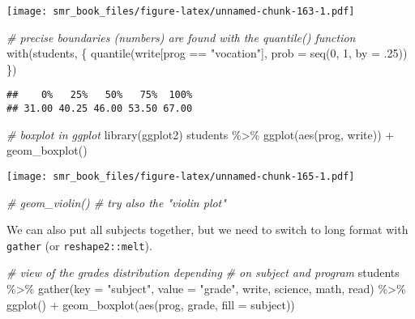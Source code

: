\documentclass[
  oneside]{book}
\newenvironment{Shaded}{\begin{snugshade}}{\end{snugshade}}
\newcommand{\AttributeTok}[1]{\textcolor[rgb]{0.77,0.63,0.00}{#1}}
\newcommand{\CommentTok}[1]{\textcolor[rgb]{0.56,0.35,0.01}{\textit{#1}}}
\newcommand{\DecValTok}[1]{\textcolor[rgb]{0.00,0.00,0.81}{#1}}
\newcommand{\FunctionTok}[1]{\textcolor[rgb]{0.00,0.00,0.00}{#1}}
\newcommand{\NormalTok}[1]{#1}
\newcommand{\SpecialCharTok}[1]{\textcolor[rgb]{0.00,0.00,0.00}{#1}}
\newcommand{\StringTok}[1]{\textcolor[rgb]{0.31,0.60,0.02}{#1}}
\begin{document}
\texttt{[image: smr\_book\_files/figure-latex/unnamed-chunk-163-1.pdf]}

\begin{Shaded}
\begin{Highlighting}[]
\CommentTok{\# precise boundaries (numbers) are found with the \textasciigrave{}quantile()\textasciigrave{} function}
\FunctionTok{with}\NormalTok{(students, \{}
  \FunctionTok{quantile}\NormalTok{(write[prog }\SpecialCharTok{==} \StringTok{"vocation"}\NormalTok{], }\AttributeTok{prob =} \FunctionTok{seq}\NormalTok{(}\DecValTok{0}\NormalTok{, }\DecValTok{1}\NormalTok{, }\AttributeTok{by =}\NormalTok{ .}\DecValTok{25}\NormalTok{))}
\NormalTok{\})}
\end{Highlighting}
\end{Shaded}

\begin{verbatim}
##    0%   25%   50%   75%  100% 
## 31.00 40.25 46.00 53.50 67.00
\end{verbatim}

\begin{Shaded}
\begin{Highlighting}[]
\CommentTok{\# boxplot in ggplot}
\FunctionTok{library}\NormalTok{(ggplot2)}
\NormalTok{students }\SpecialCharTok{\%\textgreater{}\%}
  \FunctionTok{ggplot}\NormalTok{(}\FunctionTok{aes}\NormalTok{(prog, write)) }\SpecialCharTok{+}
  \FunctionTok{geom\_boxplot}\NormalTok{()}
\end{Highlighting}
\end{Shaded}

\texttt{[image: smr\_book\_files/figure-latex/unnamed-chunk-165-1.pdf]}

\begin{Shaded}
\begin{Highlighting}[]
\CommentTok{\# geom\_violin() \# try also the "violin plot"}
\end{Highlighting}
\end{Shaded}

We can also put all subjects together, but we need to
switch to long format with \texttt{gather} (or \texttt{reshape2::melt}).

\begin{Shaded}
\begin{Highlighting}[]
\CommentTok{\# view of the grades distribution depending}
\CommentTok{\# on subject and program}
\NormalTok{students }\SpecialCharTok{\%\textgreater{}\%}
  \FunctionTok{gather}\NormalTok{(}\AttributeTok{key =} \StringTok{"subject"}\NormalTok{, }\AttributeTok{value =} \StringTok{"grade"}\NormalTok{, write, science, math, read) }\SpecialCharTok{\%\textgreater{}\%}
  \FunctionTok{ggplot}\NormalTok{() }\SpecialCharTok{+}
  \FunctionTok{geom\_boxplot}\NormalTok{(}\FunctionTok{aes}\NormalTok{(prog, grade, }\AttributeTok{fill =}\NormalTok{ subject))}
\end{Highlighting}
\end{Shaded}
\end{document}
